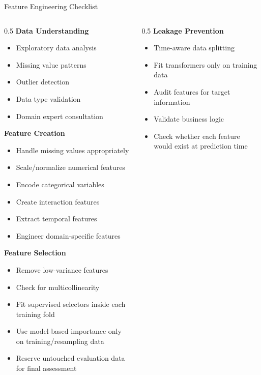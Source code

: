 \documentclass[aspectratio=169,11pt]{beamer}
\begin{document}
\begin{frame}{Feature Engineering Checklist}
\begin{columns}
\begin{column}{0.5\textwidth}
\textbf{Data Understanding}
\begin{itemize}
\item[$\square$] Exploratory data analysis
\item[$\square$] Missing value patterns
\item[$\square$] Outlier detection
\item[$\square$] Data type validation
\item[$\square$] Domain expert consultation
\end{itemize}

\vspace{0.3cm}
\textbf{Feature Creation}
\begin{itemize}
\item[$\square$] Handle missing values appropriately
\item[$\square$] Scale/normalize numerical features
\item[$\square$] Encode categorical variables
\item[$\square$] Create interaction features
\item[$\square$] Extract temporal features
\item[$\square$] Engineer domain-specific features
\end{itemize}

\vspace{0.3cm}
\textbf{Feature Selection}
\begin{itemize}
\item[$\square$] Remove low-variance features
\item[$\square$] Check for multicollinearity
\item[$\square$] Fit supervised selectors inside each training fold
\item[$\square$] Use model-based importance only on training/resampling data
\item[$\square$] Reserve untouched evaluation data for final assessment
\end{itemize}
\end{column}
\begin{column}{0.5\textwidth}
\textbf{Leakage Prevention}
\begin{itemize}
\item[$\square$] Time-aware data splitting
\item[$\square$] Fit transformers only on training data
\item[$\square$] Audit features for target information
\item[$\square$] Validate business logic
\item[$\square$] Check whether each feature would exist at prediction time
\end{itemize}


\end{column}
\end{columns}
\end{frame}
\end{document}
